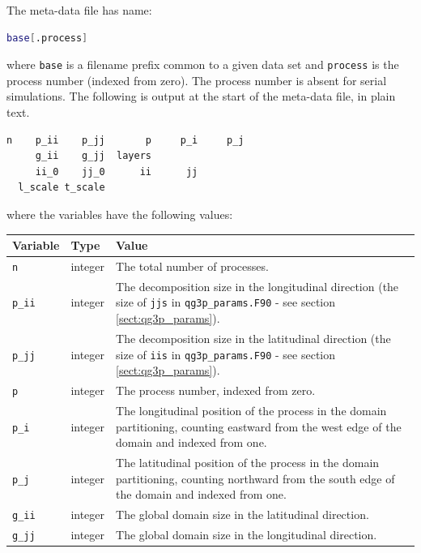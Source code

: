 \documentclass[a4paper]{book}
\begin{document}
The meta-data file has name:
\begin{lstlisting}[language = bash, frame = single]
base[.process]
\end{lstlisting}
where \verb+base+ is a filename prefix common to a given data set and
\verb+process+ is the process number (indexed from zero). The process number is
absent for serial simulations. The following is output at the start of the
meta-data file, in plain text.
\begin{lstlisting}[language = bash, frame = single]
        n    p_ii    p_jj       p     p_i     p_j
     g_ii    g_jj  layers
     ii_0    jj_0      ii      jj
  l_scale t_scale
\end{lstlisting}
where the variables have the following values:
\begin{longtable}{ | p{} | p{} | p{} | }
  \hline
  Variable & Type & Value \\
  \hline
  \endhead
  \verb+n+       & integer & The total number of processes. \\
  \verb+p_ii+    & integer & The decomposition size in the longitudinal
                             direction (the size of \verb+jjs+ in
                             \verb+qg3p_params.F90+ - see section
                             \ref{sect:qg3p_params}). \\
  \verb+p_jj+    & integer & The decomposition size in the latitudinal direction
                             (the size of \verb+iis+ in \verb+qg3p_params.F90+ -
                             see section \ref{sect:qg3p_params}). \\
  \verb+p+       & integer & The process number, indexed from zero. \\
  \verb+p_i+     & integer & The longitudinal position of the process in the
                             domain partitioning, counting eastward from the
                             west edge of the domain and indexed from one. \\
  \verb+p_j+     & integer & The latitudinal position of the process in the
                             domain partitioning, counting northward from the
                             south edge of the domain and indexed from one. \\
  \verb+g_ii+    & integer & The global domain size in the latitudinal
                             direction. \\
  \verb+g_jj+    & integer & The global domain size in the longitudinal
                             direction. \\

\end{longtable}
\end{document}
